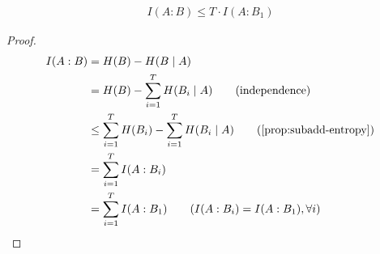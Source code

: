 \documentclass[main.tex]{subfiles}
\begin{document}
\begin{lemma}
\begin{align*}
I(A:B) \leq T \cdot I(A:B_1)
\end{align*}

\begin{proof}
\begin{align*}
	I(A:B) &= H(B) - H(B \mid A) \\
	&= H(B) - \sum_{i=1}^T H(B_i \mid A) \tag{independence} \\
	&\leq \sum_{i=1}^T H(B_i) - \sum_{i=1}^T H(B_i \mid A) \tag{\ref{prop:subadd-entropy}} \\
	&= \sum_{i=1}^T I(A :B_i) \\
	&= \sum_{i=1}^T I(A:B_1) \tag{$I(A : B_i) = I(A : B_1), \forall i$}
\end{align*}
\end{proof}
\end{lemma}
\end{document}
